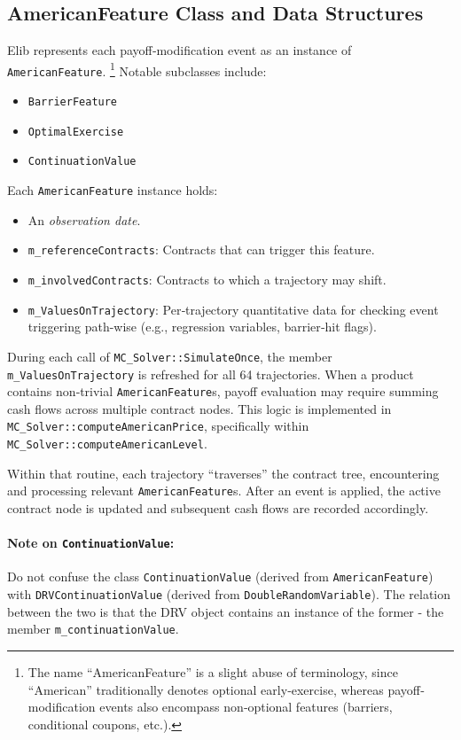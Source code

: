 \documentclass[11pt]{article}
\begin{document}
\subsection{AmericanFeature Class and Data Structures}
Elib represents each payoff‐modification event as an instance of \texttt{AmericanFeature}.%
\footnote{The name “AmericanFeature” is a slight abuse of terminology, since “American” traditionally denotes optional early‐exercise, whereas payoff‐modification events also encompass non‐optional features (barriers, conditional coupons, etc.).}  Notable subclasses include:
\begin{itemize}
  \item \texttt{BarrierFeature}  
  \item \texttt{OptimalExercise}  
  \item \texttt{ContinuationValue}  
\end{itemize}
Each \texttt{AmericanFeature} instance holds:
\begin{itemize}
  \item An \emph{observation date}.  
  \item \texttt{m\_referenceContracts}: Contracts that can trigger this feature.  
  \item \texttt{m\_involvedContracts}: Contracts to which a trajectory may shift.  
  \item \texttt{m\_ValuesOnTrajectory}: Per‐trajectory quantitative data for checking event triggering path-wise (e.g., regression variables, barrier‐hit flags).
\end{itemize}

During each call of \texttt{MC\_Solver::SimulateOnce}, the member \texttt{m\_ValuesOnTrajectory} is refreshed for all 64 trajectories. When a product contains non‐trivial \texttt{AmericanFeature}s, payoff evaluation may require summing cash flows across multiple contract nodes. This logic is implemented in \texttt{MC\_Solver::computeAmericanPrice}, specifically within \texttt{MC\_Solver::computeAmericanLevel}.

Within that routine, each trajectory “traverses” the contract tree, encountering and processing relevant \texttt{AmericanFeature}s. After an event is applied, the active contract node is updated and subsequent cash flows are recorded accordingly.

\paragraph{Note on \texttt{ContinuationValue}:}  
Do not confuse the class \texttt{ContinuationValue} (derived from \texttt{AmericanFeature}) with \texttt{DRVContinuationValue} (derived from \texttt{DoubleRandomVariable}).  The relation between the two is that
the DRV object contains an instance of the former - the
member \texttt{m\_continuationValue}.
\end{document}
